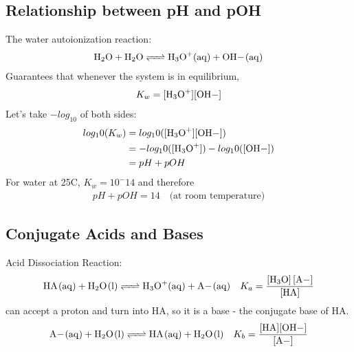 \documentclass[../CHEM152Notes.tex]{subfiles}
\begin{document}
\subsection*{Relationship between pH and pOH}
The water autoionization reaction:
\begin{equation*}
    \begin{aligned}
        \ce{H2O + H2O <=> H3O+_(aq) + OH-_(aq)}
    \end{aligned}
\end{equation*}
Guarantees that whenever the system is in equilibrium,
\begin{equation*}
    \begin{aligned}
        K_w = \ce{[H3O+][OH-]}
    \end{aligned}
\end{equation*}
Let's take $-log_10$ of both sides:
\begin{equation*}
    \begin{aligned}
        log_10(K_w) &= log_10(\ce{[H3O+][OH-]}) \\
                    &= -log_10(\ce{[H3O+]}) - log_10(\ce{[OH-]}) \\
                    &= pH + pOH
    \end{aligned}
\end{equation*}
For water at 25C, $K_w = 10^-14$ and therefore
\begin{equation*}
    \begin{aligned}
        pH + pOH = 14 \quad \text{(at room temperature)}
    \end{aligned}
\end{equation*}

\subsection*{Conjugate Acids and Bases}
Acid Dissociation Reaction:
\begin{equation*}
    \begin{aligned}
        \ce{HA_(aq) + H2O_(l) <=> H3O+_(aq) + A-_(aq)} \quad K_a = \ce{\frac{[H3O] [A-]}{[HA]}}
    \end{aligned}
\end{equation*}
 can accept a proton and turn into HA, so it is a base - the conjugate base of HA.
\begin{equation*}
    \begin{aligned}
        \ce{A-_(aq) + H2O_(l) <=> HA_(aq) + H2O_(l) } \quad K_b = \ce{\frac{[HA][OH-]}{[A-]}}
    \end{aligned}
\end{equation*}
\end{document}
